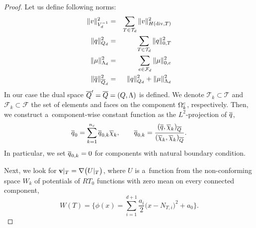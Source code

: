 \begin{proof}
Let us define following norms: 
\begin{eqnarray}
	\|v\|^2_{V^{-1}_d} &=& \sum_{T\in\mathcal{T}_d} \|v\|^2_{H(\mathrm{div} ,T)} \\
	\|q\|^2_{Q_d} &=& \sum_{T\in\mathcal{T}_d} \|q\|^2_{0,T} \\
	\|\mu\|^2_{\Lambda_d} &=& \sum_{e\in\mathcal{F}_d} \|\mu\|^2_{0,e} \\
    \|\overline q\|^2_{\overline Q_d} &=&  \|q\|^2_{Q_d} + \|\mu\|^2_{\Lambda_d}\\
\end{eqnarray}
In our case the dual space $\overline Q' = \overline Q = (Q,\Lambda)$ is defined.
We denote 
$\mathcal{T}_k\subset \mathcal{T}$ and $\mathcal{F}_k\subset \mathcal{F}$ the set 
of elements and faces on the component $\Omega^c_k$, respectively. Then, we 
construct a~component-wise constant function as the $L^2$-projection of $\overline{q}$,
\begin{equation*}
  \overline{q}_0 = \sum_{k=1}^{n_c} \overline{q}_{0, k} \overline\chi_k,
  \qquad  
  \overline{q}_{0, k} = \frac{ (\overline{q}, \overline\chi_k)_{\overline{Q}} }
  { (\overline\chi_k, \overline\chi_k)_{\overline{Q}} }.
\end{equation*}
In particular, we set $\overline{q}_{0,k} = 0$ for components with natural boundary 
condition. 

Next, we look for $\mathbf{v}|_T = \nabla \big(U|_T\big)$, where $U$ is a~function  
from the non-conforming space $W_k$ of potentials of $RT_{0}$ functions with 
zero mean on every connected component,
\begin{equation*}
  W(T)=\Big\{\phi(x) = \sum_{i=1}^{d+1} 
    \frac{a_i}{2} \big(x - N_{T,i}\big)^2 + a_0\Big\}.  
\end{equation*}


\end{proof}
